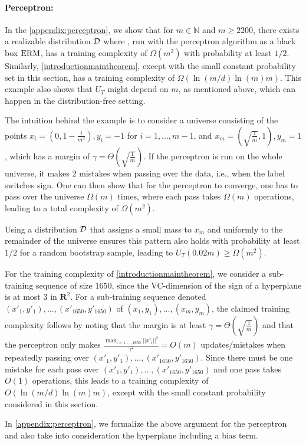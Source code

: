 \paragraph{Perceptron:}
In the \cref{appendix:perceptron}, we show that for $m \in \mathbb{N}$ and $m \geq 2200$, there exists a realizable distribution $\mathcal{D}$ where \cite{baggingoptimalPAClearner}, run with the perceptron algorithm as a black box $\mathrm{ERM}$, has a training complexity of $\Omega(m^2)$ with probability at least $1/2$. Similarly, \cref{introductionmaintheorem}, except with the small constant probability set in this section, has a training complexity of $\Omega(\ln{\left(m/d\right)}\ln{\left(m\right)}m)$. This example also shows that $U_{T}$ might depend on $m$, as mentioned above, which can happen in the distribution-free setting.

The intuition behind the example is to consider a universe consisting of the points $x_{i} = (0, 1 - \frac{i}{m^3}), y_{i} = -1$ for $i = 1, \ldots, m-1$, and $x_{m} = (\sqrt{\frac{1}{m}}, 1), y_{m} = 1$, which has a margin of $\gamma = \Theta(\sqrt{\frac{1}{m}})$. If the perceptron is run on the whole universe, it makes $2$ mistakes when passing over the data, i.e., when the label switches sign. One can then show that for the perceptron to converge, one has to pass over the universe $\Omega(m)$ times, where each pass takes $\Omega(m)$ operations, leading to a total complexity of $\Omega(m^2)$.

Using a distribution $\mathcal{D}$ that assigns a small mass to $x_{m}$ and uniformly to the remainder of the universe ensures this pattern also holds with probability at least $1/2$ for a random bootstrap sample, leading to $U_{T}(0.02m) \geq \Omega(m^{2})$.

For the training complexity of \cref{introductionmaintheorem}, we consider a sub-training sequence of size $1650$, since the VC-dimension of the sign of a hyperplane is at most $3$ in $\mathbf{R}^{2}$. For a sub-training sequence denoted $(x'_{1}, y'_{1}), \ldots, (x'_{1650}, y'_{1650})$ of $(x_{1}, y_{1}), \ldots, (x_{m}, y_{m})$, the claimed training complexity follows by noting that the margin is at least $\gamma = \Theta(\sqrt{\frac{1}{m}})$ and that the perceptron only makes $\frac{\max_{i=1, \ldots, 1650} ||x'_{i}||^{2}}{\gamma^{2}} = O(m)$ updates/mistakes when repeatedly passing over $(x'_{1}, y'_{1}), \ldots, (x'_{1650}, y'_{1650})$. Since there must be one mistake for each pass over $(x'_{1}, y'_{1}), \ldots, (x'_{1650}, y'_{1650})$ and one pass takes $O(1)$ operations, this leads to a training complexity of $O(\ln{\left(m/d\right)}\ln{\left(m\right)}m)$, except with the small constant probability considered in this section.

In \cref{appendix:perceptron}, we formalize the above argument for the perceptron and also take into consideration the hyperplane including a bias term.